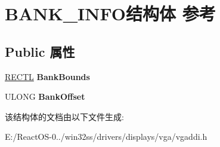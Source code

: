 \hypertarget{struct_b_a_n_k___i_n_f_o}{}\section{B\+A\+N\+K\+\_\+\+I\+N\+F\+O结构体 参考}
\label{struct_b_a_n_k___i_n_f_o}
\subsection*{Public 属性}
\begin{DoxyCompactItemize}
\item 
\mbox{\label{struct_b_a_n_k___i_n_f_o_aeb791ecf9c3f53fbf412aad03246612b}} 
\hyperlink{struct___r_e_c_t_l}{R\+E\+C\+TL} {\bfseries Bank\+Bounds}
\item 
\mbox{\label{struct_b_a_n_k___i_n_f_o_acd214a8275bbc7c7a1323ed95fcec253}} 
U\+L\+O\+NG {\bfseries Bank\+Offset}
\end{DoxyCompactItemize}


该结构体的文档由以下文件生成\+:\begin{DoxyCompactItemize}
\item 
E\+:/\+React\+O\+S-\/0../win32ss/drivers/displays/vga/vgaddi.\+h\end{DoxyCompactItemize}
